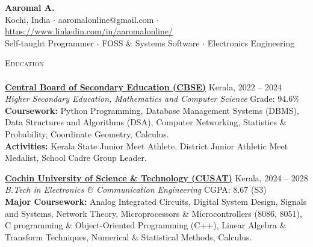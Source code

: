 \documentclass[a4paper]{article}
\newcommand{\lineunder} {
    \vspace*{-8pt} \\
    \hspace*{-18pt} \hrulefill \\
}
\newcommand{\header} [1] {
    {\hspace*{-18pt}\vspace*{6pt} \textsc{#1}}
    \vspace*{-6pt} \lineunder
}
\begin{document}
\vspace*{-40pt}

\vspace*{-10pt}
\vspace*{6mm}
\begin{center}
    {\Huge \textbf{Aaromal A.}}\\
    \vspace{8pt}
    Kochi, India $\cdot$ aaromalonline@gmail.com $\cdot$ \href{https://www.linkedin.com/in/aaromalonline/}{https://www.linkedin.com/in/aaromalonline/} \\
    \vspace{6pt}
    Self-taught Programmer $\cdot$ FOSS \& Systems Software $\cdot$ Electronics Engineering
\end{center}
\vspace*{-8pt}

\vspace*{9mm}
\header{Education}
\textbf{\href{https://www.cbse.gov.in/}{Central Board of Secondary Education (CBSE)}} \hfill Kerala, 2022 -- 2024\\
\textit{Higher Secondary Education, Mathematics and Computer Science} \hfill Grade: 94.6\%\\
\textbf{Coursework:} Python Programming, Database Management Systems (DBMS), Data Structures and Algorithms (DSA), Computer Networking, Statistics & Probability, Coordinate Geometry, Calculus.\\
\textbf{Activities:} Kerala State Junior Meet Athlete, District Junior Athletic Meet Medalist, School Cadre Group Leader.
\vspace{4mm}

\textbf{\href{https://www.cusat.ac.in/}{Cochin University of Science \& Technology (CUSAT)}} \hfill Kerala, 2024 -- 2028\\
\textit{B.Tech in Electronics \& Communication Engineering} \hfill CGPA: 8.67 (S3)\\
\textbf{Major Coursework:} Analog Integrated Circuits, Digital System Design, Signals and Systems, Network Theory, Microprocessors \& Microcontrollers (8086, 8051), C programming \& Object-Oriented Programming (C++), Linear Algebra \& Transform Techniques, Numerical \& Statistical Methods, Calculus.
\vspace*{4mm}
\end{document}
